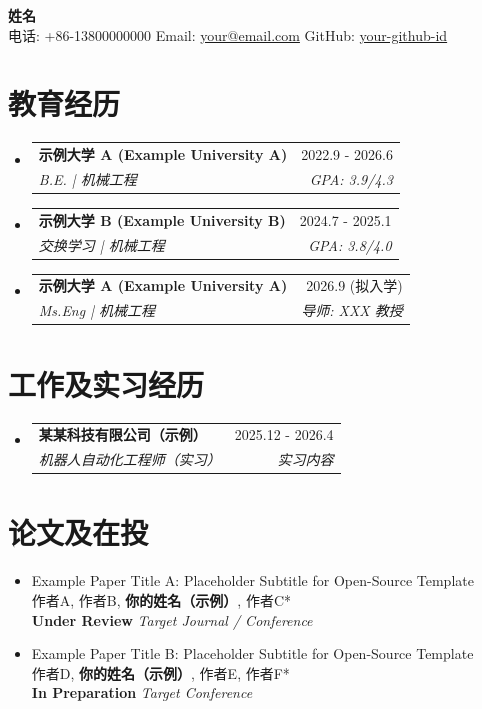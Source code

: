 \documentclass[a4paper,10pt]{article}
\makeatletter
\newcommand{\resumeSubheading}[4]{
  \vspace{-3pt}\item
    \begin{tabular*}{\linewidth}[t]{l@{\extracolsep{\fill}}r}
      \textbf{#1} & #2 \\[-2pt]
      \textit{\small#3} & \textit{\small #4} \\
    \end{tabular*}\vspace{-8pt}
}
\newcommand{\resumeSubHeadingListStart}{
  \begin{itemize}[leftmargin=0.15in, label={}, itemsep=0pt, parsep=0pt, topsep=0pt]
}
\newcommand{\resumeSubHeadingListEnd}{\end{itemize}\vspace{-12pt}}
\makeatother
\begin{document}
\vspace*{-10pt}
\begin{center}
  {\huge \textbf{姓名}} \\[4pt]
  \small
  电话: +86-13800000000 \hspace{2em}
  Email: \href{mailto:your@email.com}{your@email.com} \hspace{2em}
  GitHub: {\href{https://github.com/your-github-id}{\color{qiushiblue}your-github-id}}
\end{center}

\vspace{-20pt}

\section{教育经历}
  \resumeSubHeadingListStart
    \resumeSubheading
      {示例大学 A (Example University A)}{2022.9 - 2026.6}
      {B.E. | 机械工程}{GPA: 3.9/4.3}
      \vspace{4pt}
    \resumeSubheading
      {示例大学 B (Example University B)}{2024.7 - 2025.1}
      {交换学习 | 机械工程}{GPA: 3.8/4.0}
      \vspace{4pt}
    \resumeSubheading
      {示例大学 A (Example University A)}{2026.9 (拟入学)}
      {Ms.Eng | 机械工程}{导师: XXX 教授}
  \resumeSubHeadingListEnd

\vspace{6pt}
\section{工作及实习经历}
  \resumeSubHeadingListStart
    \resumeSubheading
      {某某科技有限公司（示例）}{2025.12 - 2026.4}
      {机器人自动化工程师（实习）}{实习内容}
  \resumeSubHeadingListEnd
\vspace{7pt}

\section{论文及在投}
  \resumeSubHeadingListStart
    \item[{\textbf{[1]}}] Example Paper Title A: Placeholder Subtitle for Open-Source Template \\
      作者A, 作者B, \textbf{你的姓名（示例）}, 作者C* \\
      \textbf{Under Review} \textit{Target Journal / Conference}
    \vspace{-2pt}
    \item[{\textbf{[2]}}] Example Paper Title B: Placeholder Subtitle for Open-Source Template \\
      作者D, \textbf{你的姓名（示例）}, 作者E, 作者F* \\
      \textbf{In Preparation} \textit{Target Conference}
  \resumeSubHeadingListEnd
\end{document}
